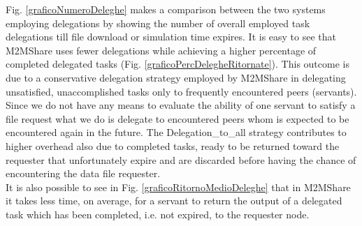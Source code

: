Fig. \ref{graficoNumeroDeleghe} makes a comparison between the two systems employing delegations by showing the number of overall employed task delegations till file download or simulation time expires. It is easy to see that M2MShare uses fewer delegations while achieving a higher percentage of completed delegated tasks (Fig. \ref{graficoPercDelegheRitornate}). This outcome is due to a conservative delegation strategy employed by M2MShare in delegating unsatisfied, unaccomplished tasks only to frequently encountered peers
(servants). Since we do not have any means to evaluate the ability of one servant to satisfy a file request what we do is delegate to encountered peers whom is expected to be encountered again in the future. The Delegation\_to\_all strategy contributes to higher overhead also due to completed tasks, ready to be returned toward the requester that unfortunately expire and are discarded before having the chance of encountering the data file requester. \\
It is also possible to see in Fig. \ref{graficoRitornoMedioDeleghe} that in M2MShare it takes less time, on average, for a servant to return the output of a delegated task which has been completed, i.e. not expired, to the requester node.
\\

